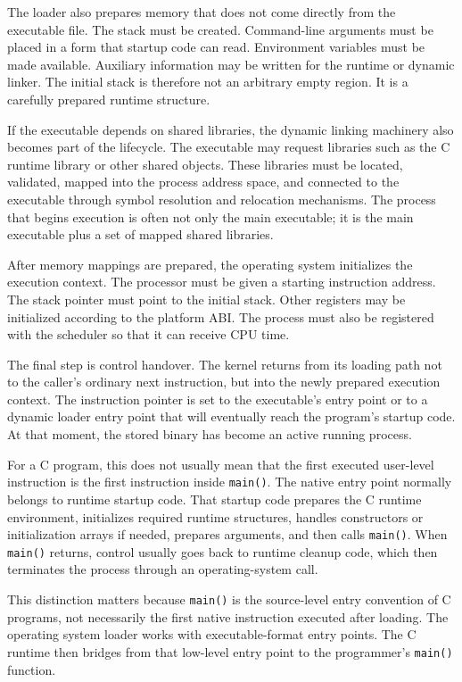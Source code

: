 The loader also prepares memory that does not come directly from the executable file. The stack must be created. Command-line arguments must be placed in a form that startup code can read. Environment variables must be made available. Auxiliary information may be written for the runtime or dynamic linker. The initial stack is therefore not an arbitrary empty region. It is a carefully prepared runtime structure.

If the executable depends on shared libraries, the dynamic linking machinery also becomes part of the lifecycle. The executable may request libraries such as the C runtime library or other shared objects. These libraries must be located, validated, mapped into the process address space, and connected to the executable through symbol resolution and relocation mechanisms. The process that begins execution is often not only the main executable; it is the main executable plus a set of mapped shared libraries.

After memory mappings are prepared, the operating system initializes the execution context. The processor must be given a starting instruction address. The stack pointer must point to the initial stack. Other registers may be initialized according to the platform ABI. The process must also be registered with the scheduler so that it can receive CPU time.

The final step is control handover. The kernel returns from its loading path not to the caller's ordinary next instruction, but into the newly prepared execution context. The instruction pointer is set to the executable's entry point or to a dynamic loader entry point that will eventually reach the program's startup code. At that moment, the stored binary has become an active running process.

For a C program, this does not usually mean that the first executed user-level instruction is the first instruction inside \texttt{main()}. The native entry point normally belongs to runtime startup code. That startup code prepares the C runtime environment, initializes required runtime structures, handles constructors or initialization arrays if needed, prepares arguments, and then calls \texttt{main()}. When \texttt{main()} returns, control usually goes back to runtime cleanup code, which then terminates the process through an operating-system call.

This distinction matters because \texttt{main()} is the source-level entry convention of C programs, not necessarily the first native instruction executed after loading. The operating system loader works with executable-format entry points. The C runtime then bridges from that low-level entry point to the programmer's \texttt{main()} function.


